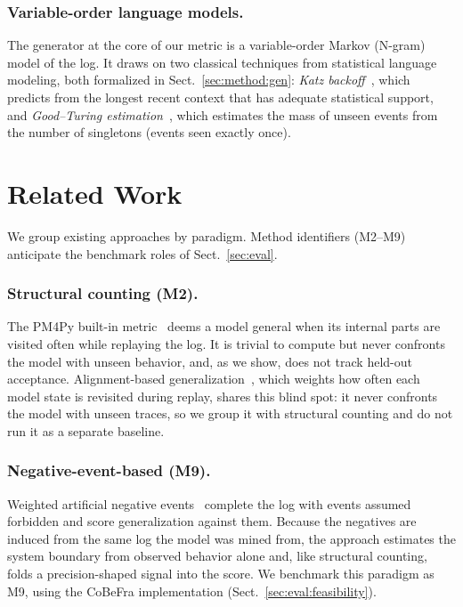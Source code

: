 \documentclass[runningheads]{llncs}
\newcommand{\chg}[1]{\textcolor{chgblue}{#1}}
\begin{document}
\subsubsection{Variable-order language models.}
The generator at the core of our metric is a variable-order Markov (N-gram) model of the log. It draws on two classical techniques from statistical language modeling, both formalized in Sect.~\ref{sec:method:gen}: \emph{Katz backoff}~\cite{katz1987}, which predicts from the longest recent context that has adequate statistical support, and \emph{Good--Turing estimation}~\cite{gale1995gt}, which estimates the mass of unseen events from the number of singletons (events seen exactly once).

\section{Related Work}
\label{sec:related}

We group existing approaches by paradigm. Method identifiers (M2--M9) anticipate the benchmark roles of Sect.~\ref{sec:eval}.

\subsubsection{Structural counting (M2).}
The PM4Py built-in metric~\cite{buijs2014quality,berti2019pm4py} deems a model general when its internal parts are visited often while replaying the log. It is trivial to compute but never confronts the model with unseen behavior, and, as we show, does not track held-out acceptance. \chg{Alignment-based generalization~\cite{vanderaalst2016pm}, which weights how often each model state is revisited during replay, shares this blind spot: it never confronts the model with unseen traces, so we group it with structural counting and do not run it as a separate baseline.}

\subsubsection{Negative-event-based (M9).}
\chg{Weighted artificial negative events~\cite{vandenbroucke2014negative} complete the log with events assumed forbidden and score generalization against them. Because the negatives are induced from the same log the model was mined from, the approach estimates the system boundary from observed behavior alone and, like structural counting, folds a precision-shaped signal into the score. We benchmark this paradigm as M9, using the CoBeFra implementation (Sect.~\ref{sec:eval:feasibility}).}
\end{document}
